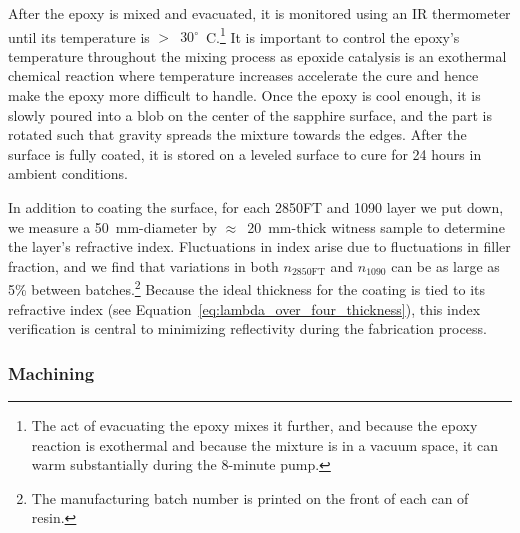 After the epoxy is mixed and evacuated, it is monitored using an IR thermometer until its temperature is $>$~$30^{\circ}$~C.\footnote{The act of evacuating the epoxy mixes it further, and because the epoxy reaction is exothermal and because the mixture is in a vacuum space, it can warm substantially during the 8-minute pump.} It is important to control the epoxy's temperature throughout the mixing process as epoxide catalysis is an exothermal chemical reaction where temperature increases  accelerate the cure and hence make the epoxy more difficult to handle. Once the epoxy is cool enough, it is slowly poured into a blob on the center of the sapphire surface, and the part is rotated such that gravity spreads the mixture towards the edges. After the surface is fully coated, it is stored on a leveled surface to cure for 24 hours in ambient conditions.

In addition to coating the surface, for each 2850FT and 1090 layer we put down, we measure a 50~mm-diameter by $\approx$~20~mm-thick witness sample to determine the layer's refractive index. Fluctuations in index arise due to fluctuations in filler fraction, and we find that variations in both $n_{\mathrm{2850FT}}$ and $n_{\mathrm{1090}}$ can be as large as 5\% between batches.\footnote{The manufacturing batch number is printed on the front of each can of resin.} Because the ideal thickness for the coating is tied to its refractive index (see Equation~\ref{eq:lambda_over_four_thickness}), this index verification is central to minimizing reflectivity during the fabrication process.


\subsubsection{Machining}
\label{sec:sapphire_ar_coating_epoxy_fabrication_machining}


